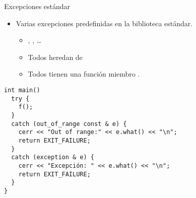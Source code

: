 \begin{frame}[t,fragile]{Excepciones estándar}
\begin{itemize}
  \item Varias excepciones predefinidas en la biblioteca estándar.
    \begin{itemize}
      \item {}, , \ldots
      \item Todos heredan de 
      \item Todos tienen una función miembro .
    \end{itemize}
\end{itemize}
\begin{lstlisting}
int main()
  try {
    f();
  }
  catch (out_of_range const & e) {
    cerr << "Out of range:" << e.what() << "\n";
    return EXIT_FAILURE;
  }
  catch (exception & e) {
    cerr << "Excepción: " << e.what() << "\n";
    return EXIT_FAILURE;
  }
}
\end{lstlisting}
\end{frame}
